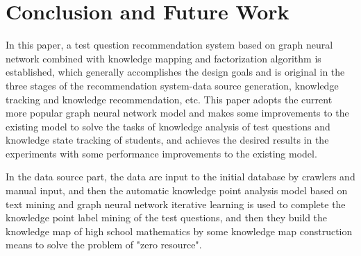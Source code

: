 \chapter{Conclusion and Future Work}
In this paper, a test question recommendation system based on graph neural network combined with knowledge mapping and factorization algorithm is established, which generally accomplishes the design goals and is original in the three stages of the recommendation system-data source generation, knowledge tracking and knowledge recommendation, etc. This paper adopts the current more popular graph neural network model and makes some improvements to the existing model to solve the tasks of knowledge analysis of test questions and knowledge state tracking of students, and achieves the desired results in the experiments with some performance improvements to the existing model.

In the data source part, the data are input to the initial database by crawlers and manual input, and then the automatic knowledge point analysis model based on text mining and graph neural network iterative learning is used to complete the knowledge point label mining of the test questions, and then they build the knowledge map of high school mathematics by some knowledge map construction means to solve the problem of "zero resource".